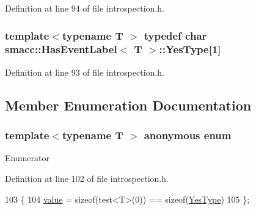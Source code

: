 Definition at line 94 of file introspection.\+h.

\subsubsection[{\texorpdfstring{Yes\+Type}{YesType}}]{\setlength{\rightskip}{0pt plus 5cm}template$<$typename T $>$ typedef char {\bf smacc\+::\+Has\+Event\+Label}$<$ T $>$\+::Yes\+Type\mbox{[}1\mbox{]}\hspace{0.3cm}{\ttfamily [private]}}\hypertarget{classsmacc_1_1HasEventLabel_a7baf4f99540d64553d8bba388b77fb25}{}\label{classsmacc_1_1HasEventLabel_a7baf4f99540d64553d8bba388b77fb25}


Definition at line 93 of file introspection.\+h.



\subsection{Member Enumeration Documentation}
\subsubsection[{\texorpdfstring{anonymous enum}{anonymous enum}}]{\setlength{\rightskip}{0pt plus 5cm}template$<$typename T $>$ anonymous enum}\hypertarget{classsmacc_1_1HasEventLabel_a7aa204bcf7a7faf203081f1eaf577bf5}{}\label{classsmacc_1_1HasEventLabel_a7aa204bcf7a7faf203081f1eaf577bf5}
\begin{Desc}
\item[Enumerator]\par
\begin{description}
\item[{\em 
value\hypertarget{classsmacc_1_1HasEventLabel_a7aa204bcf7a7faf203081f1eaf577bf5afb831cdba5590b0dd7a722637b8a1125}{}\label{classsmacc_1_1HasEventLabel_a7aa204bcf7a7faf203081f1eaf577bf5afb831cdba5590b0dd7a722637b8a1125}
}]\end{description}
\end{Desc}


Definition at line 102 of file introspection.\+h.


\begin{DoxyCode}
103     \{
104         \hyperlink{classsmacc_1_1HasEventLabel_a7aa204bcf7a7faf203081f1eaf577bf5afb831cdba5590b0dd7a722637b8a1125}{value} = \textcolor{keyword}{sizeof}(test<T>(0)) == \textcolor{keyword}{sizeof}(\hyperlink{classsmacc_1_1HasEventLabel_a7baf4f99540d64553d8bba388b77fb25}{YesType})
105     \};
\end{DoxyCode}


